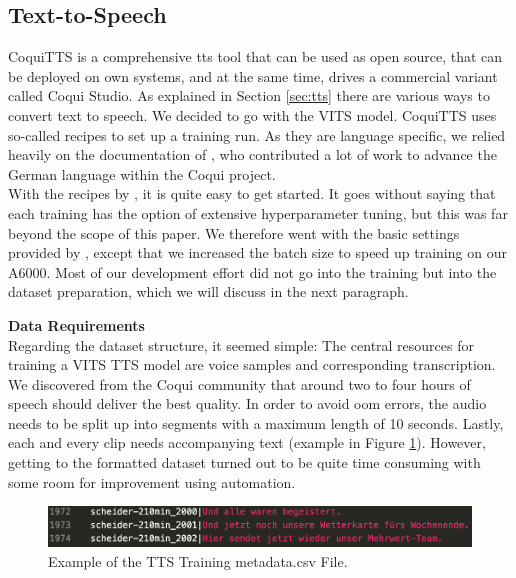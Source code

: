\documentclass[
  a4paper,  %
  twoside,  %
  bibliography=totoc,
  headsepline,
  cleardoublepage=empty,
  parskip=half,
  draft=false
]{scrbook}
\begin{document}
\subsection{Text-to-Speech}
CoquiTTS is a comprehensive \gls*{tts} tool that can be used as open source, that can be deployed on own systems, and at the same time, drives a commercial variant called Coqui Studio. As explained in Section \ref{sec:tts} there are various ways to convert text to speech. We decided to go with the VITS model. CoquiTTS uses so-called recipes to set up a training run. As they are language specific, we relied heavily on the documentation of \citet{mullerThorstenVoice2023}, who contributed a lot of work to advance the German language within the Coqui project. \\
With the recipes by , it is quite easy to get started. It goes without saying that each training has the option of extensive hyperparameter tuning, but this was far beyond the scope of this paper. We therefore went with the basic settings provided by , except that we increased the batch size to speed up training on our A6000. Most of our development effort did not go into the training but into the dataset preparation, which we will discuss in the next paragraph.

\textbf{Data Requirements} \\
Regarding the dataset structure, it seemed simple: The central resources for training a VITS TTS model are voice samples and corresponding transcription. We discovered from the Coqui community that around two to four hours of speech should deliver the best quality. In order to avoid \gls{oom} errors, the audio needs to be split up into segments with a maximum length of 10 seconds. Lastly, each and every clip needs accompanying text (example in Figure \ref{fig:metadata.csv}). However, getting to the formatted dataset turned out to be quite time consuming with some room for improvement using automation.

\begin{figure}[h]
  \centering
  \includegraphics[width=1\textwidth]{./graphics/tts/csv.png}
  \caption{Example of the TTS Training metadata.csv File.}
  \label{fig:metadata.csv}
\end{figure}
\end{document}
